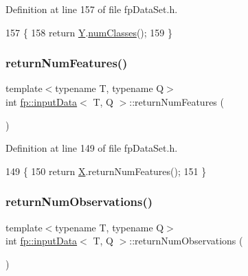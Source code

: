 Definition at line 157 of file fp\+Data\+Set.\+h.


\begin{DoxyCode}
157                                      \{
158             \textcolor{keywordflow}{return} \hyperlink{classfp_1_1inputData_a2ec8c0c7b9a8e114673c703edea4283d}{Y}.\hyperlink{classfp_1_1inputYDataClassification_ade4b45e3da55233214135b6de8976297}{numClasses}();
159         \}
\end{DoxyCode}
\mbox{\label{classfp_1_1inputData_ae9362286ea7706a8b0d91ba96e9ad478}} 
\subsubsection{\texorpdfstring{return\+Num\+Features()}{returnNumFeatures()}}
{\footnotesize\ttfamily template$<$typename T, typename Q$>$ \\
int \hyperlink{classfp_1_1inputData}{fp\+::input\+Data}$<$ T, Q $>$\+::return\+Num\+Features (\begin{DoxyParamCaption}{ }\end{DoxyParamCaption})\hspace{0.3cm}{\ttfamily [inline]}}



Definition at line 149 of file fp\+Data\+Set.\+h.


\begin{DoxyCode}
149                                       \{
150             \textcolor{keywordflow}{return} \hyperlink{classfp_1_1inputData_ad19581a60d2af60ebd3c8be5ac5ad95e}{X}.returnNumFeatures();
151         \}
\end{DoxyCode}
\mbox{\label{classfp_1_1inputData_af7dc02941195e025d1d89c882096027d}} 
\subsubsection{\texorpdfstring{return\+Num\+Observations()}{returnNumObservations()}}
{\footnotesize\ttfamily template$<$typename T, typename Q$>$ \\
int \hyperlink{classfp_1_1inputData}{fp\+::input\+Data}$<$ T, Q $>$\+::return\+Num\+Observations (\begin{DoxyParamCaption}{ }\end{DoxyParamCaption})\hspace{0.3cm}{\ttfamily [inline]}}



